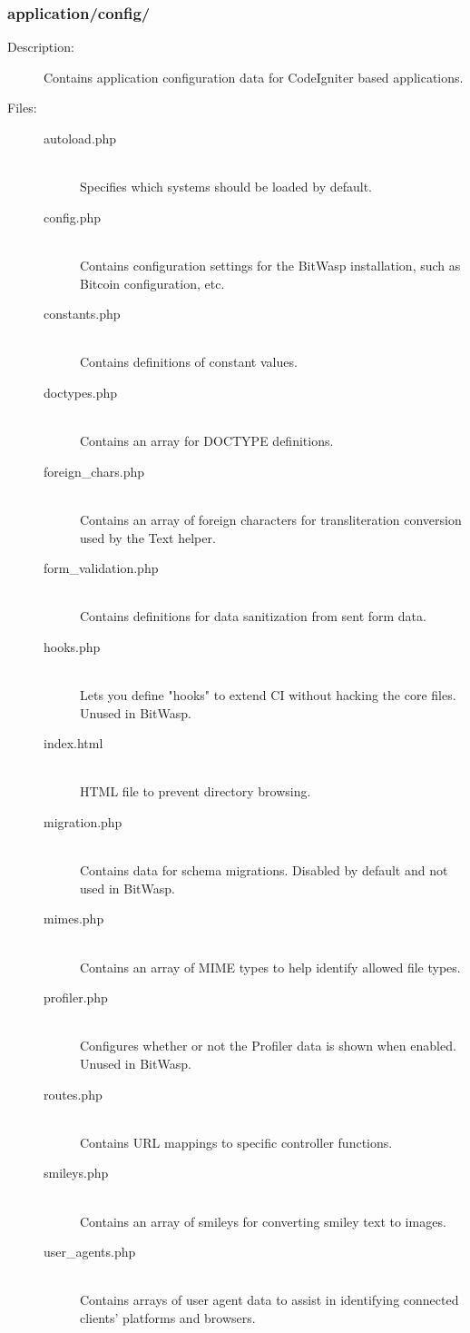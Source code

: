 \documentclass[11pt]{article} %
\begin{document}
\subsubsection{application/config/}
\begin{description}
\item[Description:] Contains application configuration data for CodeIgniter based applications.
\item[Files:] \textbf{ }
\begin{description}
\item[autoload.php]  \textbf{ }\\
Specifies which systems should be loaded by default.
\item[config.php]  \textbf{ }\\
Contains configuration settings for the BitWasp installation, such as Bitcoin configuration, etc.
\item[constants.php]  \textbf{ }\\
Contains definitions of constant values.
\item[doctypes.php]  \textbf{ }\\
Contains an array for DOCTYPE definitions.
\item[foreign\_chars.php]  \textbf{ }\\
Contains an array of foreign characters for transliteration conversion used by the Text helper.
\item[form\_validation.php]  \textbf{ }\\
Contains definitions for data sanitization from sent form data.
\item[hooks.php]  \textbf{ }\\
Lets you define "hooks" to extend CI without hacking the core files. Unused in BitWasp.
\item[index.html]  \textbf{ }\\
HTML file to prevent directory browsing.
\item[migration.php]  \textbf{ }\\
Contains data for schema migrations. Disabled by default and not used in BitWasp.
\item[mimes.php]  \textbf{ }\\
Contains an array of MIME types to help identify allowed file types.
\item[profiler.php]  \textbf{ }\\
Configures whether or not the Profiler data is shown when enabled. Unused in BitWasp.
\item[routes.php]  \textbf{ }\\
Contains URL mappings to specific controller functions.
\item[smileys.php]  \textbf{ }\\
Contains an array of smileys for converting smiley text to images.
\item[user\_agents.php]  \textbf{ }\\
Contains arrays of user agent data to assist in identifying connected clients' platforms and browsers.
\end{description} 
\end{description} 
\end{document}
